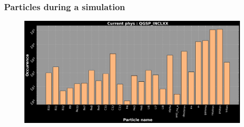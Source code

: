 \begin{frame}
\frametitle{Particles during a simulation}

\begin{figure}
	\includegraphics[width=1.0\textwidth]{images/particle_dist_E100_phQGSP_INCLXX.png}
\end{figure}

\end{frame}